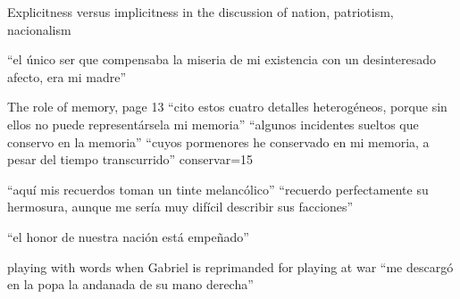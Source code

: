 \documentclass[12pt]{article}
\title{}
\makeatletter
\newcommand\iraggedright{%
	\let\\\@centercr\@rightskip\@flushglue \rightskip\@rightskip
	\leftskip\z@skip}
\makeatother
\begin{document}
	\makeheader
	\iraggedright

Explicitness versus implicitness in the discussion of nation, patriotism, nacionalism

\enquote{el único ser que compensaba la miseria de mi existencia con un desinteresado afecto, era mi madre} 

The role of memory, page 13
\enquote{cito estos cuatro detalles heterogéneos, porque sin ellos no puede representársela mi memoria} \cite[13]{Galdos..}
\enquote{algunos incidentes sueltos que conservo en la memoria} \cite[66]{Galdos1882}
\enquote{cuyos pormenores he conservado en mi memoria, a pesar del tiempo transcurrido}  \cite[392]{Galdos1882}
conservar=15

\enquote{aquí mis recuerdos toman un tinte melancólico}
\enquote{recuerdo perfectamente su hermosura, aunque me sería muy difícil describir sus facciones}

\enquote{el honor de nuestra nación está empeñado}

playing with words when Gabriel is reprimanded for playing at war
\enquote{me descargó en la popa la andanada de su mano derecha} \cite[416]{Galdos1882}


\makeworkscited
\listoftodos
\end{document}
